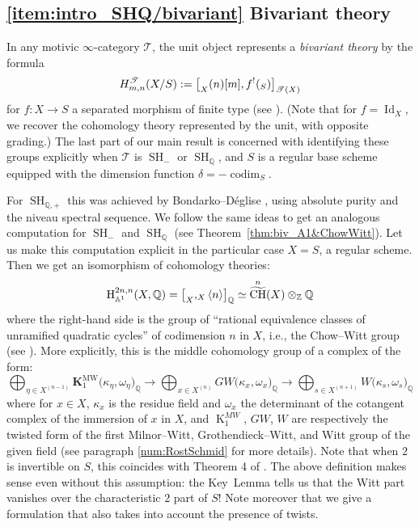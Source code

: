 \documentclass[11pt]{article}
\makeatletter
\newcommand{\ie}{i.e.,\xspace}
\numberwithin{equation}{section}\renewcommand{\encodingdefault}{TU}
\DeclareRobustCommand{\mathbbm}[1]{\csname jepbb@#1\endcsname}
\newcommand{\T}{\mathscr T}
\renewcommand{\AA}{\mathbb A}
\newcommand{\un}{\mathbbm 1}
\newcommand{\KMW}{\mathbf K^\mathrm{MW}}
\newcommand{\HA}{\mathrm H_{\AA^1}}
\DeclareMathOperator{\codim}{codim}
\DeclareMathOperator{\SH}{SH}
\DeclareMathOperator{\Id}{Id}
\DeclareMathOperator{\wCH}{\widetilde{CH}}
\newcommand{\twist}[1]{\langle #1 \rangle}
\DeclareMathOperator{\K}{K}
\newcommand{\ZZ} {\mathbb Z}
\newcommand{\QQ} {\mathbb Q}
\theoremstyle{remark}
\theoremstyle{definition}
\numberwithin{equation}{thm}
\makeatother
\begin{document}
\subsection*{\eqref{item:intro_SHQ/bivariant} Bivariant theory}

In any motivic $\infty$-category $\T$, the unit object represents a \emph{bivariant theory} by the formula
\[
H^\T_{m,n}(X/S) := \big[ \un_X(n)[m], f^!(\un_S) \big]_{\T(X)}
\]
for $f : X \to S$ a separated morphism of finite type (see \cite[Def.\,1.2.2]{DegliseBivariant}).
(Note that for $f=\Id_X$, we recover the cohomology theory represented by the unit, with opposite grading.)
The last part of our main result is concerned with identifying these groups explicitly when $\T$ is $\SH_{-}$ or $\SH_\QQ$, and $S$ is a regular base scheme equipped with the dimension function $\delta = -\codim_S$.

For $\SH_{\QQ,+}$ this was achieved by Bondarko--Déglise \cite[Th.\,2]{BD1}, using absolute purity and the niveau spectral sequence.
We follow the same ideas to get an analogous computation for $\SH_{-}$ and $\SH_\QQ$ (see Theorem~\ref{thm:biv_A1&ChowWitt}).
Let us make this computation explicit in the particular case $X=S$, a regular scheme.
Then we get an isomorphism of cohomology theories:
\[
\HA^{2n,n}(X,\QQ)=\big[\un_X,\un_X\twist n\big]_\QQ \simeq \wCH^n(X) \otimes_\ZZ \QQ
\]
where the right-hand side is the group of ``rational equivalence classes of unramified quadratic cycles'' of codimension $n$ in $X$, \ie the Chow--Witt group (see \cite{Fasel_wCH, FaselSrinivas}).
More explicitly, this is the middle cohomology group of a complex of the form:
\[
\bigoplus_{\eta \in X^{(n-1)}} \KMW_1\big(\kappa_\eta,\omega_\eta\big)_\QQ
\to \bigoplus_{x \in X^{(n)}} GW\big(\kappa_x,\omega_x\big)_\QQ
\to \bigoplus_{s \in X^{(n+1)}} W\big(\kappa_s,\omega_s\big)_\QQ
\]
where for $x \in X$, $\kappa_x$ is the residue field
and $\omega_x$ the determinant of the cotangent complex of the immersion of $x$ in $X$,
and $\K_1^{MW}$, $GW$, $W$ are respectively the twisted form of the
first Milnor--Witt, Grothendieck--Witt, and Witt group of the given field
(see paragraph \ref{num:RostSchmid} for more details).
Note that when $2$ is invertible on $S$, this coincides with Theorem 4 of \cite{FaselSrinivas}.
The above definition makes sense even without this assumption: the Key~Lemma tells us that the Witt part vanishes over the characteristic $2$ part of $S$!
Note moreover that we give a formulation that also takes into account the presence of twists.
\end{document}
